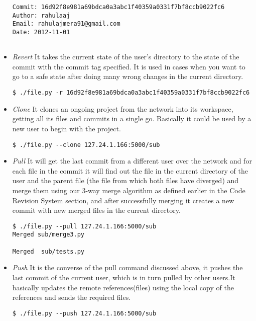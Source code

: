 \documentclass[12pt]{article}
\begin{document}
\begin{itemize}
\begin{lstlisting}
Commit: 16d92f8e981a69bdca0a3abc1f40359a0331f7bf8ccb9022fc6
Author: rahulaaj
Email: rahulajmera91@gmail.com
Date: 2012-11-01


\end{lstlisting}
\item \emph{Revert} It takes the current state of the user's directory to the state of the commit with the commit tag specified. It is used in cases when you want to go to a safe state after doing many wrong changes in the current directory.
\begin{lstlisting}
$ ./file.py -r 16d92f8e981a69bdca0a3abc1f40359a0331f7bf8ccb9022fc6
\end{lstlisting}
\item \emph{Clone} It clones an ongoing project from the network into its workspace, getting all its files and commits in a single go. Basically it could be used by a new user to begin with the project.
\begin{lstlisting}
$ ./file.py --clone 127.24.1.166:5000/sub
\end{lstlisting}

\item \emph{Pull} It will get the last commit from a different user over the network and for each file in the commit it will find out the file in the current directory of the user and the parent file (the file from which both files have diverged) and merge them using our 3-way merge algorithm as defined earlier in the Code Revision System section, and after successfully merging it creates a new commit with new merged files in the current directory.
\begin{lstlisting}
$ ./file.py --pull 127.24.1.166:5000/sub
Merged sub/merge3.py

Merged  sub/tests.py
\end{lstlisting}
\item \emph{Push} It is the converse of the pull command discussed above, it pushes the last commit of the current user, which is in turn pulled by other users.It basically updates the remote references(files) using the local copy of the references and sends the required files.
\begin{lstlisting}
$ ./file.py --push 127.24.1.166:5000/sub

\end{lstlisting}
\end{itemize}
\end{document}
